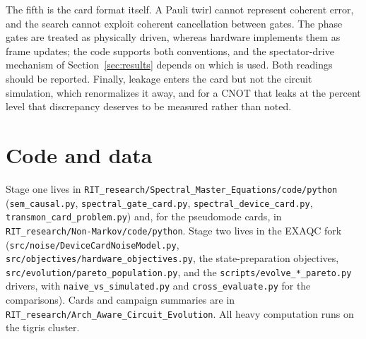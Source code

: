 \documentclass[10pt]{article}
\begin{document}
The fifth is the card format itself. A Pauli twirl cannot represent coherent
error, and the search cannot exploit coherent cancellation between gates. The
phase gates are treated as physically driven, whereas hardware implements them
as frame updates; the code supports both conventions, and the spectator-drive
mechanism of Section~\ref{sec:results} depends on which is used. Both readings
should be reported. Finally, leakage enters the card but not the circuit
simulation, which renormalizes it away, and for a CNOT that leaks at the
percent level that discrepancy deserves to be measured rather than noted.

{\sloppy
\section*{Code and data}

Stage one lives in \nolinkurl{RIT_research/Spectral_Master_Equations/code/python}
(\texttt{sem\_causal.py}, \texttt{spectral\_gate\_card.py},
\texttt{spectral\_device\_card.py}, \texttt{transmon\_card\_problem.py}) and, for
the pseudomode cards, in \nolinkurl{RIT_research/Non-Markov/code/python}. Stage
two lives in the EXAQC fork (\nolinkurl{src/noise/DeviceCardNoiseModel.py},
\nolinkurl{src/objectives/hardware_objectives.py}, the state-preparation
objectives, \nolinkurl{src/evolution/pareto_population.py}, and the
\texttt{scripts/evolve\_*\_pareto.py} drivers, with
\texttt{naive\_vs\_simulated.py} and \texttt{cross\_evaluate.py} for the
comparisons). Cards and campaign summaries are in
\nolinkurl{RIT_research/Arch_Aware_Circuit_Evolution}. All heavy computation
runs on the tigris cluster.

}
\end{document}
